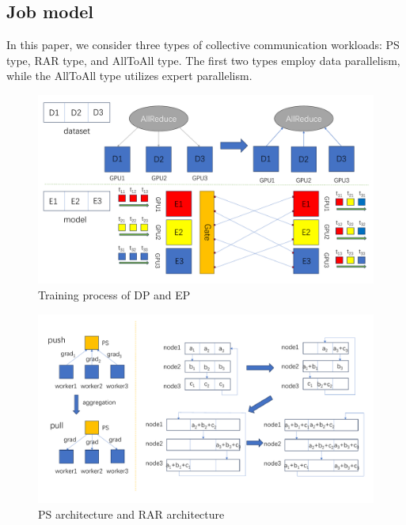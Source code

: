 \documentclass[conference]{IEEEtran}
\begin{document}
\subsection{Job model}

In this paper, we consider three types of collective communication workloads: PS type, RAR type, and AllToAll type. The first two types employ data parallelism, while the AllToAll type utilizes expert parallelism. 

\begin{figure}
	\centering
	\includegraphics[width=1\linewidth]{figure/picture4}
	\caption{Training process of DP and EP}
	\label{fig:picture4}
\end{figure}

\begin{figure}
	\centering
	\includegraphics[width=1\linewidth]{figure/picture5}
	\caption{PS architecture and RAR architecture}
	\label{fig:picture5}
\end{figure}
\end{document}
